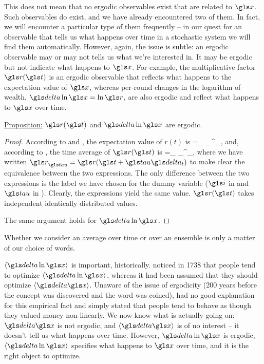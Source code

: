 This does not mean that no ergodic observables exist that are related
to $\x$. Such observables do exist, and
we have already encountered two of them. In fact, we will encounter a particular type
of them frequently -- in our quest for an observable that tells us what happens over
time in a stochastic system we will find them automatically. However, again, the issue
is subtle: an ergodic observable may or may not tells us what we're interested in.
It may be ergodic but not indicate what happens to $\x$. For example, 
the multiplicative factor $\gr(\t)$ is an 
ergodic observable that reflects what happens to the expectation value of $\x$, 
whereas per-round changes in the logarithm of wealth, $\d \ln \x = \ln \gr$, are also ergodic 
and reflect what happens to $\x$ over time.

\vspace{.3cm}
\underline{Proposition:} $\gr(\t)$ and $\d \ln \x$  are ergodic.

\begin{proof}

According to  and , the expectation value of $r(t)$ is
\be
\ave{\gr}=\lim_{\N\to\infty}  \sum_\gi^\N \gr_\gi,
\ee
and, according to , the time average of $\gr(\t)$ is
\be
\tave{\gr}=\lim_{\T\to\infty}  \sum_\gtau^\T \gr_\gtau,
\ee
where we have written $\gr_\gtau = \gr(\t+\gtau\dt)$ to make clear the equivalence between the two expressions. The only difference between the two expressions is the label we have chosen
for the dummy variable ($\gi$ in  and $\gtau$ in ). Clearly, the 
expressions yield the same value. $\gr(\t)$ takes independent identically distributed values.

The same argument holds for $\d \ln \x$.
\end{proof}

Whether we consider  an average over 
time or over an ensemble is only a matter of our choice of words. 

$\ave{\d \ln \x}$ is important, historically.  noticed in 
1738 \cite{Bernoulli1738} that people tend to
optimize $\ave{\d \ln \x}$, whereas it had been assumed that they should optimize $\ave{\d \x}$. 
Unaware of the issue of ergodicity (200 years before the concept was discovered 
and the word was coined),  had no good explanation for this 
empirical fact and simply stated that people tend to behave as though they valued
money non-linearly. We now know what is actually going on: $\d \x$ is not ergodic, 
and $\ave{\d \x}$ is of no interest -- it doesn't tell us what happens over time. However,
$\d \ln \x$ is ergodic, $\ave{\d \ln \x}$ specifies what happens to $\x$ over time, and it
is the right object to optimize.


